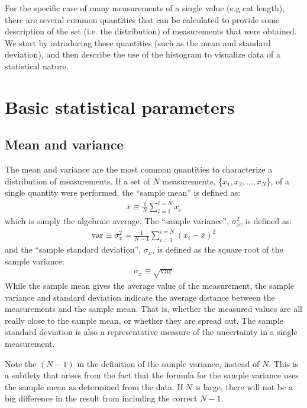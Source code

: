 For the specific case of many measurements of a single value (e.g cat length), there are several common quantities that can be calculated to provide some description of the set (i.e. the distribution) of measurements that were obtained. We start by introducing those quantities (such as the mean and standard deviation), and then describe the use of the histogram to visualize data of a statistical nature.

\section{Basic statistical parameters}

\subsection{Mean and variance}

The mean and variance are the most common quantities to characterize a distribution of measurements. If a set of $N$ measurements, \{$x_1, x_2, \dots,x_N$\}, of a single quantity were performed, the ``sample mean'' is defined as:
\begin{align}
 \bar{x} \equiv \frac{1}{N} \sum_{i=1}^{i=N} x_i  
\end{align}
which is simply the algebraic average. The ``sample variance'', $\sigma_x^2$, is defined as:
\begin{align}
 \text{var}\equiv \sigma_x^2 = \frac{1}{N-1} \sum_{i=1}^{i=N} (x_i-\bar{x})^2 
\end{align}
and the ``sample standard deviation'', $\sigma_x$, is defined as the square root of the sample variance:
\begin{align}
 \sigma_x\equiv\sqrt{\text{var}}
\end{align}
While the sample mean gives the average value of the measurement, the sample variance and standard deviation indicate the average distance between the measurements and the sample mean. That is, whether the measured values are all really close to the sample mean, or whether they are spread out. The sample standard deviation is also a representative measure of the uncertainty in a single measurement. 

Note the $(N-1)$ in the definition of the sample variance, instead of $N$. This is a subtlety that arises from the fact that the formula for the sample variance uses the sample mean as determined from the data. If $N$ is large, there will not be a big difference in the result from including the correct $N-1$.

